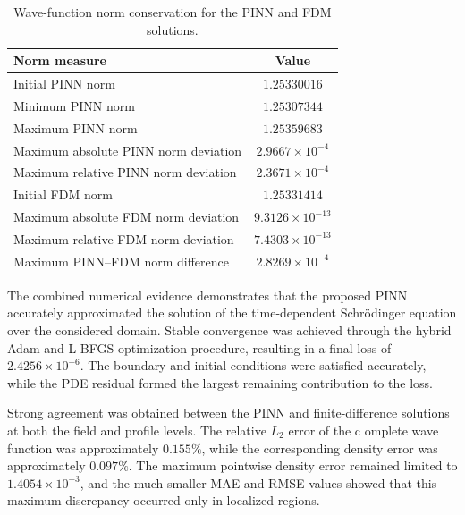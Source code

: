 \documentclass[11pt]{article}
\begin{document}
\begin{table}[htbp]
\centering
\caption{Wave-function norm conservation for the PINN and FDM solutions.}
\label{tab:norm_conservation}
\begin{tabular}{lc}
\hline
\textbf{Norm measure} & \textbf{Value} \\
\hline
Initial PINN norm
& \(1.25330016\) \\

Minimum PINN norm
& \(1.25307344\) \\

Maximum PINN norm
& \(1.25359683\) \\

Maximum absolute PINN norm deviation
& \(2.9667\times10^{-4}\) \\

Maximum relative PINN norm deviation
& \(2.3671\times10^{-4}\) \\

Initial FDM norm
& \(1.25331414\) \\

Maximum absolute FDM norm deviation
& \(9.3126\times10^{-13}\) \\

Maximum relative FDM norm deviation
& \(7.4303\times10^{-13}\) \\

Maximum PINN--FDM norm difference
& \(2.8269\times10^{-4}\) \\
\hline
\end{tabular}

\end{table}


The combined numerical evidence demonstrates that the proposed PINN 
accurately approximated the solution of the time-dependent Schrödinger 
equation over the considered domain. Stable convergence was achieved 
through the hybrid Adam and L-BFGS optimization procedure, resulting 
in a final loss of \(2.4256\times10^{-6}\). The boundary and initial 
conditions were satisfied accurately, while the PDE residual formed 
the largest remaining contribution to the loss.

Strong agreement was obtained between the PINN and finite-difference 
solutions at both the field and profile levels. The relative \(L_2\) error of the c
omplete wave function was approximately \(0.155\%\), while the corresponding density 
error was approximately \(0.097\%\). The maximum pointwise density error remained 
limited to \(1.4054\times10^{-3}\), and the much smaller MAE and RMSE values showed 
that this maximum discrepancy occurred only in localized regions.
\end{document}
